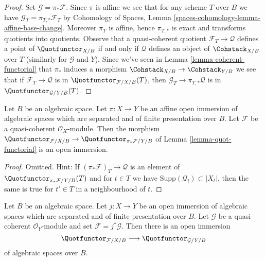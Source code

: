 \begin{proof}
Set $\mathcal{G} = \pi_*\mathcal{F}$. Since $\pi$ is affine we see that for
any scheme $T$ over $B$ we have $\mathcal{G}_T = \pi_{T, *}\mathcal{F}_T$ by
Cohomology of Spaces, Lemma \ref{spaces-cohomology-lemma-affine-base-change}.
Moreover $\pi_T$ is affine, hence $\pi_{T, *}$ is exact and transforms
quotients into quotients. Observe that a quasi-coherent quotient
$\mathcal{F}_T \to \mathcal{Q}$ defines a point of $\Quotfunctor_{X/B}$
if and only if $\mathcal{Q}$ defines an object of $\Cohstack_{X/B}$
over $T$ (similarly for $\mathcal{G}$ and $Y$). Since we've seen in
Lemma \ref{lemma-coherent-functorial}
that $\pi_*$ induces a morphism $\Cohstack_{X/B} \to \Cohstack_{Y/B}$
we see that if $\mathcal{F}_T \to \mathcal{Q}$ is in
$\Quotfunctor_{\mathcal{F}/X/B}(T)$, then
$\mathcal{G}_T \to \pi_{T, *}\mathcal{Q}$ is
in $\Quotfunctor_{\mathcal{G}/Y/B}(T)$.
\end{proof}

\begin{lemma}
\label{lemma-quot-open}
Let $B$ be an algebraic space. Let $\pi : X \to Y$ be an affine open immersion
of algebraic spaces which are separated and of finite presentation over $B$.
Let $\mathcal{F}$ be a quasi-coherent $\mathcal{O}_X$-module. Then the morphism
$\Quotfunctor_{\mathcal{F}/X/B} \to \Quotfunctor_{\pi_*\mathcal{F}/Y/B}$ of
Lemma \ref{lemma-quot-functorial} is an open immersion.
\end{lemma}

\begin{proof}
Omitted. Hint: If $(\pi_*\mathcal{F})_T \to \mathcal{Q}$ is an element of
$\Quotfunctor_{\pi_*\mathcal{F}/Y/B}(T)$
and for $t \in T$ we have $\text{Supp}(\mathcal{Q}_t) \subset |X_t|$,
then the same is true for $t' \in T$ in a neighbourhood of $t$.
\end{proof}

\begin{lemma}
\label{lemma-quot-better-open}
Let $B$ be an algebraic space. Let $j : X \to Y$ be an open immersion
of algebraic spaces which are separated and of finite presentation over $B$.
Let $\mathcal{G}$ be a quasi-coherent $\mathcal{O}_Y$-module and set
$\mathcal{F} = j^*\mathcal{G}$. Then there is an open immersion
$$
\Quotfunctor_{\mathcal{F}/X/B}
\longrightarrow
\Quotfunctor_{\mathcal{G}/Y/B}
$$
of algebraic spaces over $B$.
\end{lemma}


